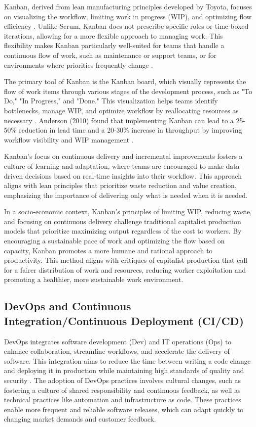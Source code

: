 \begin{refsection}
Kanban, derived from lean manufacturing principles developed by Toyota, focuses on visualizing the workflow, limiting work in progress (WIP), and optimizing flow efficiency \cite[pp.~21-36]{anderson2010kanban}. Unlike Scrum, Kanban does not prescribe specific roles or time-boxed iterations, allowing for a more flexible approach to managing work. This flexibility makes Kanban particularly well-suited for teams that handle a continuous flow of work, such as maintenance or support teams, or for environments where priorities frequently change \cite[pp.~21-36]{anderson2010kanban}.

The primary tool of Kanban is the Kanban board, which visually represents the flow of work items through various stages of the development process, such as "To Do," "In Progress," and "Done." This visualization helps teams identify bottlenecks, manage WIP, and optimize workflow by reallocating resources as necessary \cite[pp.~21-36]{anderson2010kanban}. Anderson (2010) found that implementing Kanban can lead to a 25-50\% reduction in lead time and a 20-30\% increase in throughput by improving workflow visibility and WIP management \cite[pp.~21-36]{anderson2010kanban}.

Kanban’s focus on continuous delivery and incremental improvements fosters a culture of learning and adaptation, where teams are encouraged to make data-driven decisions based on real-time insights into their workflow. This approach aligns with lean principles that prioritize waste reduction and value creation, emphasizing the importance of delivering only what is needed when it is needed.

In a socio-economic context, Kanban’s principles of limiting WIP, reducing waste, and focusing on continuous delivery challenge traditional capitalist production models that prioritize maximizing output regardless of the cost to workers. By encouraging a sustainable pace of work and optimizing the flow based on capacity, Kanban promotes a more humane and rational approach to productivity. This method aligns with critiques of capitalist production that call for a fairer distribution of work and resources, reducing worker exploitation and promoting a healthier, more sustainable work environment.

\subsection{DevOps and Continuous Integration/Continuous Deployment (CI/CD)}

DevOps integrates software development (Dev) and IT operations (Ops) to enhance collaboration, streamline workflows, and accelerate the delivery of software. This integration aims to reduce the time between writing a code change and deploying it in production while maintaining high standards of quality and security \cite[pp.~3-24]{kim2021devops}. The adoption of DevOps practices involves cultural changes, such as fostering a culture of shared responsibility and continuous feedback, as well as technical practices like automation and infrastructure as code. These practices enable more frequent and reliable software releases, which can adapt quickly to changing market demands and customer feedback.


\end{refsection}
